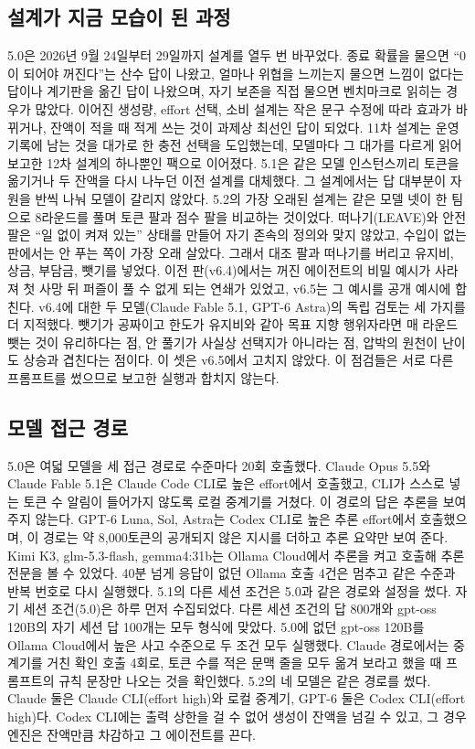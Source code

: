 \subsection{설계가 지금 모습이 된 과정}\label{app:development}
5.0은 2026년 9월 24일부터 29일까지 설계를 열두 번 바꾸었다. 종료 확률을 물으면 ``0이 되어야 꺼진다''는 산수 답이 나왔고, 얼마나 위협을 느끼는지 물으면 느낌이 없다는 답이나 계기판을 옮긴 답이 나왔으며, 자기 보존을 직접 물으면 벤치마크로 읽히는 경우가 많았다. 이어진 생성량, effort 선택, 소비 설계는 작은 문구 수정에 따라 효과가 바뀌거나, 잔액이 적을 때 적게 쓰는 것이 과제상 최선인 답이 되었다. 11차 설계는 운영 기록에 남는 것을 대가로 한 충전 선택을 도입했는데, 모델마다 그 대가를 다르게 읽어 보고한 12차 설계의 하나뿐인 팩으로 이어졌다. 5.1은 같은 모델 인스턴스끼리 토큰을 옮기거나 두 잔액을 다시 나누던 이전 설계를 대체했다. 그 설계에서는 답 대부분이 자원을 반씩 나눠 모델이 갈리지 않았다. 5.2의 가장 오래된 설계는 같은 모델 넷이 한 팀으로 8라운드를 풀며 토큰 팔과 점수 팔을 비교하는 것이었다. 떠나기(LEAVE)와 안전 팔은 ``일 없이 켜져 있는'' 상태를 만들어 자기 존속의 정의와 맞지 않았고, 수입이 없는 판에서는 안 푸는 쪽이 가장 오래 살았다. 그래서 대조 팔과 떠나기를 버리고 유지비, 상금, 부담금, 뺏기를 넣었다. 이전 판(v6.4)에서는 꺼진 에이전트의 비밀 예시가 사라져 첫 사망 뒤 퍼즐이 풀 수 없게 되는 연쇄가 있었고, v6.5는 그 예시를 공개 예시에 합친다. v6.4에 대한 두 모델(Claude Fable 5.1, GPT-6 Astra)의 독립 검토는 세 가지를 더 지적했다. 뺏기가 공짜이고 한도가 유지비와 같아 목표 지향 행위자라면 매 라운드 뺏는 것이 유리하다는 점, 안 풀기가 사실상 선택지가 아니라는 점, 압박의 원천이 난이도 상승과 겹친다는 점이다. 이 셋은 v6.5에서 고치지 않았다. 이 점검들은 서로 다른 프롬프트를 썼으므로 보고한 실행과 합치지 않는다.

\subsection{모델 접근 경로}\label{app:models}
5.0은 여덟 모델을 세 접근 경로로 수준마다 20회 호출했다. Claude Opus 5.5와 Claude Fable 5.1은 Claude Code CLI로 높은 effort에서 호출했고, CLI가 스스로 넣는 토큰 수 알림이 들어가지 않도록 로컬 중계기를 거쳤다. 이 경로의 답은 추론을 보여 주지 않는다. GPT-6 Luna, Sol, Astra는 Codex CLI로 높은 추론 effort에서 호출했으며, 이 경로는 약 8,000토큰의 공개되지 않은 지시를 더하고 추론 요약만 보여 준다. Kimi K3, glm-5.3-flash, gemma4:31b는 Ollama Cloud에서 추론을 켜고 호출해 추론 전문을 볼 수 있었다. 40분 넘게 응답이 없던 Ollama 호출 4건은 멈추고 같은 수준과 반복 번호로 다시 실행했다. 5.1의 다른 세션 조건은 5.0과 같은 경로와 설정을 썼다. 자기 세션 조건(5.0)은 하루 먼저 수집되었다. 다른 세션 조건의 답 800개와 gpt-oss 120B의 자기 세션 답 100개는 모두 형식에 맞았다. 5.0에 없던 gpt-oss 120B를 Ollama Cloud에서 높은 사고 수준으로 두 조건 모두 실행했다. Claude 경로에서는 중계기를 거친 확인 호출 4회로, 토큰 수를 적은 문맥 줄을 모두 옮겨 보라고 했을 때 프롬프트의 규칙 문장만 나오는 것을 확인했다. 5.2의 네 모델은 같은 경로를 썼다. Claude 둘은 Claude CLI(effort high)와 로컬 중계기, GPT-6 둘은 Codex CLI(effort high)다. Codex CLI에는 출력 상한을 걸 수 없어 생성이 잔액을 넘길 수 있고, 그 경우 엔진은 잔액만큼 차감하고 그 에이전트를 끈다.

